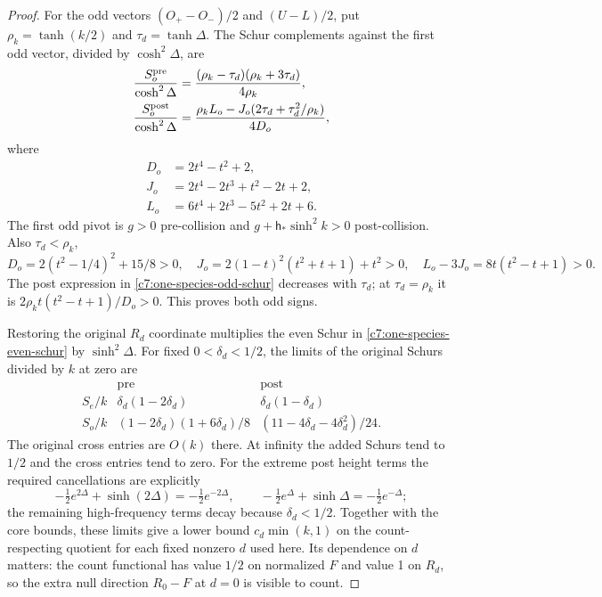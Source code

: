 \begin{proof}
For the odd vectors $(O_+-O_-)/2$ and $(U-L)/2$, put
$\rho_k=\tanh(k/2)$ and $\tau_d=\tanh\Delta$. The Schur complements
against the first odd vector, divided by $\cosh^2\Delta$, are
\begin{equation}\label{c7:one-species-odd-schur}
\begin{aligned}
 \frac{S_o^{\rm pre}}{\cosh^2\Delta}
 &=\frac{(\rho_k-\tau_d)(\rho_k+3\tau_d)}{4\rho_k},\\
 \frac{S_o^{\rm post}}{\cosh^2\Delta}
 &=\frac{\rho_k L_o-J_o(2\tau_d+\tau_d^2/\rho_k)}{4D_o},
\end{aligned}
\end{equation}
where
\[
\begin{aligned}
 D_o&=2t^4-t^2+2,\\
 J_o&=2t^4-2t^3+t^2-2t+2,\\
 L_o&=6t^4+2t^3-5t^2+2t+6.
\end{aligned}
\]
The first odd pivot is $g>0$ pre-collision and
$g+\mathsf h_*\sinh^2k>0$ post-collision. Also $\tau_d<\rho_k$,
\[
 D_o=2(t^2-1/4)^2+15/8>0,\quad
 J_o=2(1-t)^2(t^2+t+1)+t^2>0,\quad
 L_o-3J_o=8t(t^2-t+1)>0.
\]
The post expression in \eqref{c7:one-species-odd-schur} decreases with
$\tau_d$; at $\tau_d=\rho_k$ it is
$2\rho_k t(t^2-t+1)/D_o>0$. This proves both odd signs.

Restoring the original $R_d$ coordinate multiplies the even Schur in
\eqref{c7:one-species-even-schur} by $\sinh^2\Delta$. For fixed
$0<\delta_d<1/2$, the limits of the original Schurs divided by $k$ at
zero are
\[
\begin{array}{c|cc}
 &\mathrm{pre}&\mathrm{post}\\\hline
 S_e/k&\delta_d(1-2\delta_d)&\delta_d(1-\delta_d)\\
 S_o/k&(1-2\delta_d)(1+6\delta_d)/8&(11-4\delta_d-4\delta_d^2)/24.
\end{array}
\]
The original cross entries are $O(k)$ there. At infinity the added
Schurs tend to $1/2$ and the cross entries tend to zero. For the extreme
post height terms the required cancellations are explicitly
\[
 -\tfrac12e^{2\Delta}+\sinh(2\Delta)=-\tfrac12e^{-2\Delta},\qquad
 -\tfrac12e^{\Delta}+\sinh\Delta=-\tfrac12e^{-\Delta};
\]
the remaining high-frequency terms decay because $\delta_d<1/2$.
Together with the core bounds, these limits give a lower bound
$c_d\min(k,1)$ on the count-respecting quotient for each fixed nonzero
$d$ used here. Its dependence on $d$ matters: the count functional has
value $1/2$ on normalized $F$ and value 1 on $R_d$, so the extra null
direction $R_0-F$ at $d=0$ is visible to count.


\end{proof}
